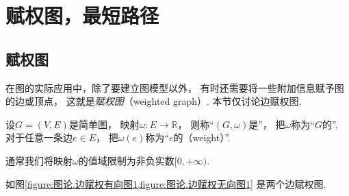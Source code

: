 \section{赋权图，最短路径}
\subsection{赋权图}
在图的实际应用中，除了要建立图模型以外，
有时还需要将一些附加信息赋予图的边或顶点，
这就是\emph{赋权图}（weighted graph）.
本节仅讨论边赋权图.

\begin{definition}
设\(G = (V,E)\)是简单图，
映射\(\omega\colon E \to \mathbb{R}\)，
则称“\((G,\omega)\)是”，
把\(\omega\)称为“\(G\)的”.
对于任意一条边\(e \in E\)，
把\(\omega(e)\)称为“\(e\)的（weight）”.
\end{definition}

通常我们将映射\(\omega\)的值域限制为非负实数\([0,+\infty)\).

如图\cref{figure:图论.边赋权有向图1,figure:图论.边赋权无向图1} 是两个边赋权图.

